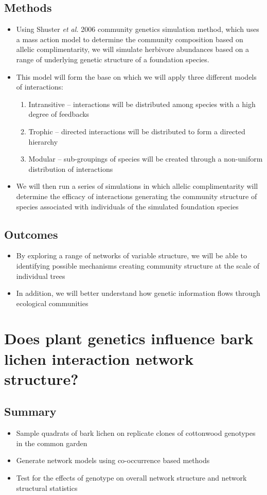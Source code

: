 \documentclass[12pt]{article}
\newcommand{\etal}{\textit{et al.} }
\begin{document}
\subsection{Methods}
\begin{itemize}
\item Using Shuster \etal 2006 community genetics simulation method,
  which uses a mass action model to determine the community
  composition based on allelic complimentarity, we will simulate
  herbivore abundances based on a range of underlying genetic
  structure of a foundation species.
\item This model will form the base on which we will apply three
  different models of interactions:
  \begin{enumerate}
  \item Intransitive -- interactions will be distributed among species
    with a high degree of feedbacks
  \item Trophic -- directed interactions will be distributed to form a
    directed hierarchy
  \item Modular -- sub-groupings of species will be created through a
    non-uniform distribution of interactions
  \end{enumerate}
\item We will then run a series of simulations in which allelic
  complimentarity will determine the efficacy of interactions
  generating the community structure of species associated with
  individuals of the simulated foundation species
\end{itemize}

\subsection{Outcomes}
\begin{itemize}
\item By exploring a range of networks of variable structure, we will
  be able to identifying possible mechanisms creating community
  structure at the scale of individual trees
\item In addition, we will better understand how genetic information
  flows through ecological communities
\end{itemize}


\section{Does plant genetics influence bark lichen interaction network
  structure?}
\subsection{Summary}
\begin{itemize}
\item Sample quadrats of bark lichen on replicate clones of
  cottonwood genotypes in the common garden
\item Generate network models using co-occurrence based methods
\item Test for the effects of genotype on overall network structure
  and network structural statistics
\end{itemize}
\end{document}
